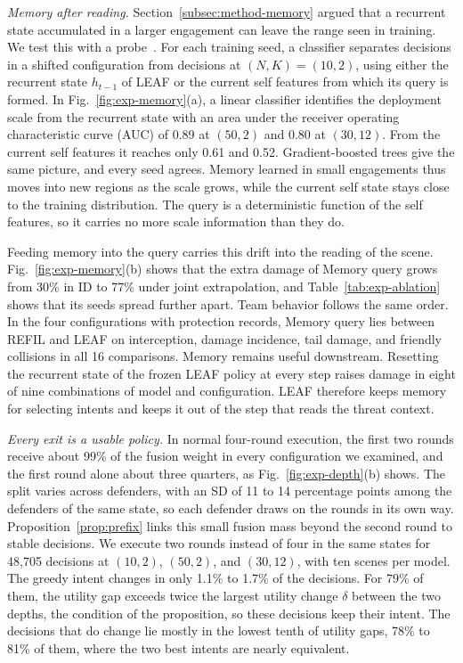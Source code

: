 \emph{Memory after reading.} Section~\ref{subsec:method-memory} argued that a recurrent state accumulated in a larger engagement can leave the range seen in training. We test this with a probe~\cite{alain2017probes}. For each training seed, a classifier separates decisions in a shifted configuration from decisions at $(N,K)=(10,2)$, using either the recurrent state $h_{t-1}$ of LEAF or the current self features from which its query is formed. In Fig.~\ref{fig:exp-memory}(a), a linear classifier identifies the deployment scale from the recurrent state with an area under the receiver operating characteristic curve (AUC) of 0.89 at $(50,2)$ and 0.80 at $(30,12)$. From the current self features it reaches only 0.61 and 0.52. Gradient-boosted trees give the same picture, and every seed agrees. Memory learned in small engagements thus moves into new regions as the scale grows, while the current self state stays close to the training distribution. The query is a deterministic function of the self features, so it carries no more scale information than they do.

Feeding memory into the query carries this drift into the reading of the scene. Fig.~\ref{fig:exp-memory}(b) shows that the extra damage of Memory query grows from 30\% in ID to 77\% under joint extrapolation, and Table~\ref{tab:exp-ablation} shows that its seeds spread further apart. Team behavior follows the same order. In the four configurations with protection records, Memory query lies between REFIL and LEAF on interception, damage incidence, tail damage, and friendly collisions in all 16 comparisons. Memory remains useful downstream. Resetting the recurrent state of the frozen LEAF policy at every step raises damage in eight of nine combinations of model and configuration. LEAF therefore keeps memory for selecting intents and keeps it out of the step that reads the threat context.

\emph{Every exit is a usable policy.} In normal four-round execution, the first two rounds receive about 99\% of the fusion weight in every configuration we examined, and the first round alone about three quarters, as Fig.~\ref{fig:exp-depth}(b) shows. The split varies across defenders, with an SD of 11 to 14 percentage points among the defenders of the same state, so each defender draws on the rounds in its own way. Proposition~\ref{prop:prefix} links this small fusion mass beyond the second round to stable decisions. We execute two rounds instead of four in the same states for 48{,}705 decisions at $(10,2)$, $(50,2)$, and $(30,12)$, with ten scenes per model. The greedy intent changes in only 1.1\% to 1.7\% of the decisions. For 79\% of them, the utility gap exceeds twice the largest utility change $\delta$ between the two depths, the condition of the proposition, so these decisions keep their intent. The decisions that do change lie mostly in the lowest tenth of utility gaps, 78\% to 81\% of them, where the two best intents are nearly equivalent.

